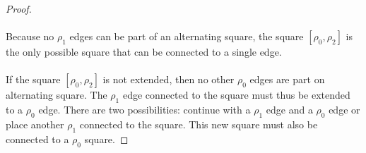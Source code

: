 \begin{proof}
  \paragraph{}
  Because no $\rho_1$ edges can be part of an alternating square, the square $[\rho_0, \rho_2]$ is the only possible square that can be connected to a single edge.

  \begin{figure}[H]
    \begin{center}
      \caption{}
    \end{center}
  \end{figure}

  \paragraph{}
  If the square $[\rho_0, \rho_2]$ is not extended, then no other $\rho_0$ edges are part on alternating square. The $\rho_1$ edge connected to the square must thus be extended to a $\rho_0$ edge. There are two possibilities: continue with a $\rho_1$ edge and a $\rho_0$ edge or place another $\rho_1$ connected to the square. This new square must also be connected to a $\rho_0$ square.


\end{proof}
